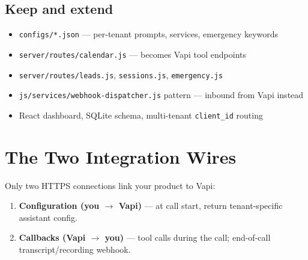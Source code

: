 \documentclass[11pt,a4paper]{article}
\begin{document}
\subsection{Keep and extend}
\begin{itemize}
  \item \texttt{configs/*.json} --- per-tenant prompts, services, emergency keywords
  \item \texttt{server/routes/calendar.js} --- becomes Vapi tool endpoints
  \item \texttt{server/routes/leads.js}, \texttt{sessions.js}, \texttt{emergency.js}
  \item \texttt{js/services/webhook-dispatcher.js} pattern --- inbound from Vapi instead
  \item React dashboard, SQLite schema, multi-tenant \texttt{client\_id} routing
\end{itemize}

\section{The Two Integration Wires}

Only two HTTPS connections link your product to Vapi:

\begin{enumerate}
  \item \textbf{Configuration (you $\rightarrow$ Vapi)} --- at call start, return tenant-specific assistant config.
  \item \textbf{Callbacks (Vapi $\rightarrow$ you)} --- tool calls during the call; end-of-call transcript/recording webhook.
\end{enumerate}

\begin{center}
\end{center}
\end{document}
